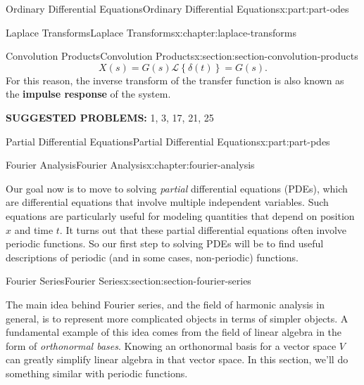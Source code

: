 \documentclass[oneside,10pt,]{book}
\newcommand{\terminology}[1]{\textbf{#1}}
\numberwithin{equation}{part}
\newcommand{\Laplace}[1]{\mathcal{L}\left\{#1\right\}}
\begin{document}
\begin{partptx}{Ordinary Differential Equations}{}{Ordinary Differential Equations}{}{}{x:part:part-odes}
\begin{chapterptx}{Laplace Transforms}{}{Laplace Transforms}{}{}{x:chapter:laplace-transforms}
\begin{sectionptx}{Convolution Products}{}{Convolution Products}{}{}{x:section:section-convolution-products}
\begin{equation*}
X(s) = G(s)\Laplace{\delta(t)} = G(s)\text{.}
\end{equation*}
For this reason, the inverse transform of the transfer function is also known as the \terminology{impulse response} of the system.%
\par
\terminology{SUGGESTED PROBLEMS:} 1, 3, 17, 21, 25%
\end{sectionptx}
\end{chapterptx}
 \end{partptx}
%
%
\typeout{************************************************}
\typeout{************************************************}
%
\begin{partptx}{Partial Differential Equations}{}{Partial Differential Equations}{}{}{x:part:part-pdes}
%
\typeout{************************************************}
\typeout{************************************************}
%
\begin{chapterptx}{Fourier Analysis}{}{Fourier Analysis}{}{}{x:chapter:fourier-analysis}
\begin{introduction}{}%
Our goal now is to move to solving \emph{partial} differential equations (PDEs), which are differential equations that involve multiple independent variables. Such equations are particularly useful for modeling quantities that depend on position \(x\) and time \(t\). It turns out that these partial differential equations often involve periodic functions. So our first step to solving PDEs will be to find useful descriptions of periodic (and in some cases, non-periodic) functions.%
\end{introduction}%
%
%
\typeout{************************************************}
\typeout{************************************************}
%
\begin{sectionptx}{Fourier Series}{}{Fourier Series}{}{}{x:section:section-fourier-series}
\begin{introduction}{}%
The main idea behind Fourier series, and the field of harmonic analysis in general, is to represent more complicated objects in terms of simpler objects. A fundamental example of this idea comes from the field of linear algebra in the form of \emph{orthonormal bases}. Knowing an orthonormal basis for a vector space \(V\) can greatly simplify linear algebra in that vector space. In this section, we'll do something similar with periodic functions.%
\end{introduction}%

\end{sectionptx}
\end{chapterptx}
\end{partptx}
\end{document}
